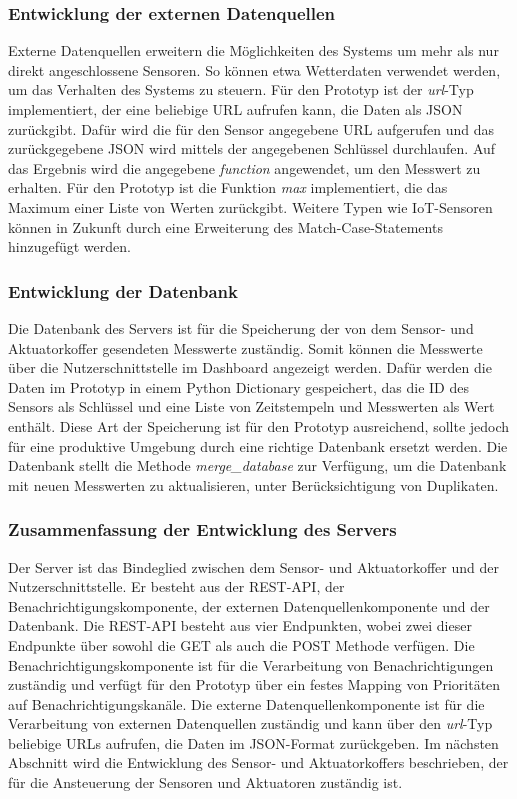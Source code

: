 \subsubsection{Entwicklung der externen Datenquellen}
Externe Datenquellen erweitern die Möglichkeiten des Systems um mehr als nur direkt angeschlossene Sensoren.
So können etwa Wetterdaten verwendet werden, um das Verhalten des Systems zu steuern.
Für den Prototyp ist der \emph{url}-Typ implementiert, der eine beliebige URL aufrufen kann, die Daten als JSON zurückgibt.
Dafür wird die für den Sensor angegebene URL aufgerufen und das zurückgegebene JSON wird mittels der angegebenen Schlüssel durchlaufen.
Auf das Ergebnis wird die angegebene \emph{function} angewendet, um den Messwert zu erhalten.
Für den Prototyp ist die Funktion \emph{max} implementiert, die das Maximum einer Liste von Werten zurückgibt.
Weitere Typen wie IoT-Sensoren können in Zukunft durch eine Erweiterung des Match-Case-Statements hinzugefügt werden.

\subsubsection{Entwicklung der Datenbank}
Die Datenbank des Servers ist für die Speicherung der von dem Sensor- und Aktuatorkoffer gesendeten Messwerte zuständig.
Somit können die Messwerte über die Nutzerschnittstelle im Dashboard angezeigt werden.
Dafür werden die Daten im Prototyp in einem Python Dictionary gespeichert, das die ID des Sensors als Schlüssel und eine Liste von Zeitstempeln und Messwerten als Wert enthält.
Diese Art der Speicherung ist für den Prototyp ausreichend, sollte jedoch für eine produktive Umgebung durch eine richtige Datenbank ersetzt werden.
Die Datenbank stellt die Methode \emph{merge\_database} zur Verfügung, um die Datenbank mit neuen Messwerten zu aktualisieren, unter Berücksichtigung von Duplikaten.

\subsubsection{Zusammenfassung der Entwicklung des Servers}
Der Server ist das Bindeglied zwischen dem Sensor- und Aktuatorkoffer und der Nutzerschnittstelle.
Er besteht aus der REST-API, der Benachrichtigungskomponente, der externen Datenquellenkomponente und der Datenbank.
Die REST-API besteht aus vier Endpunkten, wobei zwei dieser Endpunkte über sowohl die GET als auch die POST Methode verfügen.
Die Benachrichtigungskomponente ist für die Verarbeitung von Benachrichtigungen zuständig und verfügt für den Prototyp über ein festes Mapping von Prioritäten auf Benachrichtigungskanäle.
Die externe Datenquellenkomponente ist für die Verarbeitung von externen Datenquellen zuständig und kann über den \emph{url}-Typ beliebige URLs aufrufen, die Daten im JSON-Format zurückgeben.
Im nächsten Abschnitt wird die Entwicklung des Sensor- und Aktuatorkoffers beschrieben, der für die Ansteuerung der Sensoren und Aktuatoren zuständig ist.


